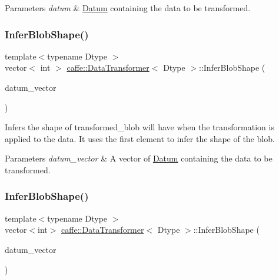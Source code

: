 \begin{DoxyParams}{Parameters}
{\em datum} & \mbox{\hyperlink{classcaffe_1_1_datum}{Datum}} containing the data to be transformed. \\
\hline
\end{DoxyParams}
\mbox{\label{classcaffe_1_1_data_transformer_ac829dd6448dcce67acb1e22a2554db4b}} 
\subsubsection{\texorpdfstring{Infer\+Blob\+Shape()}{InferBlobShape()}\hspace{0.1cm}{\footnotesize\ttfamily [3/4]}}
{\footnotesize\ttfamily template$<$typename Dtype $>$ \\
vector$<$ int $>$ \mbox{\hyperlink{classcaffe_1_1_data_transformer}{caffe\+::\+Data\+Transformer}}$<$ Dtype $>$\+::Infer\+Blob\+Shape (\begin{DoxyParamCaption}\item[{const vector$<$ \mbox{\hyperlink{classcaffe_1_1_datum}{Datum}} $>$ \&}]{datum\+\_\+vector }\end{DoxyParamCaption})}



Infers the shape of transformed\+\_\+blob will have when the transformation is applied to the data. It uses the first element to infer the shape of the blob. 


\begin{DoxyParams}{Parameters}
{\em datum\+\_\+vector} & A vector of \mbox{\hyperlink{classcaffe_1_1_datum}{Datum}} containing the data to be transformed. \\
\hline
\end{DoxyParams}
\mbox{\label{classcaffe_1_1_data_transformer_ad4e4f3c11822fbe2f37d2d7f82bcc36e}} 
\subsubsection{\texorpdfstring{Infer\+Blob\+Shape()}{InferBlobShape()}\hspace{0.1cm}{\footnotesize\ttfamily [4/4]}}
{\footnotesize\ttfamily template$<$typename Dtype $>$ \\
vector$<$int$>$ \mbox{\hyperlink{classcaffe_1_1_data_transformer}{caffe\+::\+Data\+Transformer}}$<$ Dtype $>$\+::Infer\+Blob\+Shape (\begin{DoxyParamCaption}\item[{const vector$<$ \mbox{\hyperlink{classcaffe_1_1_datum}{Datum}} $>$ \&}]{datum\+\_\+vector }\end{DoxyParamCaption})}



